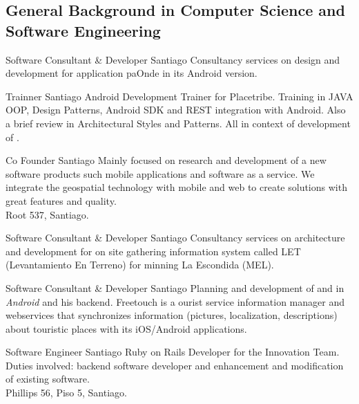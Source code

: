 \documentclass[11pt,letterpaper,roman]{moderncv}
\begin{document}
\newcommand{\tchr}{Trainner\xspace}
\newcommand{\valpo}{Valparaíso}
\newcommand{\stgo}{Santiago}

\newcommand{\se}{Software Engineer\xspace}
\newcommand{\scd}{Software Consultant \& Developer\xspace}
\newcommand{\sd}{Software Developer\xspace}
\newcommand{\sarch}{Software Architect\xspace}
\newcommand{\cf}{Co Founder\xspace}
\newcommand{\intership}{Intern\xspace}
\newcommand{\fdsw}[1]{Feria de Software #1 at UTFSM\xspace}	
\newcommand{\sence}{\href{http://www.sence.cl/sence/}{\textsc{SENCE}}\xspace}

\newcommand{\android}{\textsl{Android}\xspace}

\subsection{General Background in Computer Science and Software Engineering}


	 {\scd} {\paonde} {\stgo} {}
	{Consultancy services on design and development for application paOnde
in its Android version.} 

	 {\tchr} {\placetribe} {\stgo} {}
	{Android Development Trainer for Placetribe. Training in JAVA
	OOP, Design Patterns, Android SDK and REST integration with Android. Also a
	brief review in Architectural Styles and Patterns. All in context of development
	of \placetribeapp.}

	 {\cf} {\ingennia} {\stgo} {}
	{Mainly focused on research and development of a new software products
	such mobile applications and software as a service. We integrate the geospatial
	technology with mobile and web to create solutions with great features and
	quality. \\ Root 537, Santiago.}

	 {\scd} {\jobbitgames} {\stgo} {}
	{Consultancy services on architecture and development for on site
gathering information system called LET (Levantamiento En Terreno) for minning
La Escondida (MEL).} 

	 {\scd} {\mataveri} {\stgo} {}
	{Planning and development of \freetouchchile and \freetouchperu in
	\android and his backend.  Freetouch is a ourist service information manager and
	webservices that synchronizes information (pictures, localization, descriptions)
	about touristic places with its iOS/Android applications.}
	
	 {\se} {\multicaja} {\stgo} {}
	{Ruby on Rails Developer for the Innovation Team. Duties involved:
backend software developer and enhancement and modification of existing
software. \\
	Phillips 56, Piso 5, Santiago.}
\end{document}
